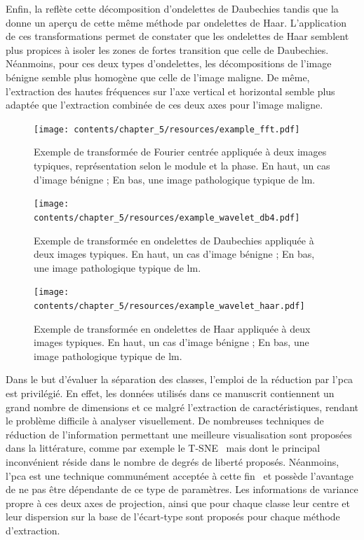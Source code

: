 Enfin, la  reflète cette décomposition d'ondelettes de Daubechies tandis que la  donne un aperçu de cette même méthode par ondelettes de Haar. L'application de ces transformations permet de constater que les ondelettes de Haar semblent plus propices à isoler les zones de fortes transition que celle de Daubechies. Néanmoins, pour ces deux types d'ondelettes, les décompositions de l'image bénigne semble plus homogène que celle de l'image maligne. De même, l'extraction des hautes fréquences sur l'axe vertical et horizontal semble plus adaptée que l'extraction combinée de ces deux axes pour l'image maligne.\par

\begin{figure}[H]
    \centering
    \texttt{[image: contents/chapter\_5/resources/example\_fft.pdf]}
    \caption{Exemple de transformée de Fourier centrée appliquée à deux images typiques, représentation selon le module et la phase. En haut, un cas d'image bénigne ; En bas, une image pathologique typique de \gls{lm}.}
    \label{fig:example_fft}
\end{figure}\par

\begin{figure}[H]
    \centering
    \texttt{[image: contents/chapter\_5/resources/example\_wavelet\_db4.pdf]}
    \caption{Exemple de transformée en ondelettes de Daubechies appliquée à deux images typiques. En haut, un cas d'image bénigne ; En bas, une image pathologique typique de \gls{lm}.}
    \label{fig:example_wavelet_db4}
\end{figure}\par

\begin{figure}[H]
    \centering
    \texttt{[image: contents/chapter\_5/resources/example\_wavelet\_haar.pdf]}
    \caption{Exemple de transformée en ondelettes de Haar appliquée à deux images typiques. En haut, un cas d'image bénigne ; En bas, une image pathologique typique de \gls{lm}.}
    \label{fig:example_wavelet_haar}
\end{figure}\par

Dans le but d'évaluer la séparation des classes, l'emploi de la réduction par l'\gls{pca} est privilégié. En effet, les données utilisés dans ce manuscrit contiennent un grand nombre de dimensions et ce malgré l'extraction de caractéristiques, rendant le problème difficile à analyser visuellement. De nombreuses techniques de réduction de l'information permettant une meilleure visualisation sont proposées dans la littérature, comme par exemple le T-SNE~\cite{Maaten2008} mais dont le principal inconvénient réside dans le nombre de degrés de liberté proposés. Néanmoins, l'\gls{pca} est une technique communément acceptée à cette fin~\cite{Himberg2001} et possède l'avantage de ne pas être dépendante de ce type de paramètres. Les informations de variance propre à ces deux axes de projection, ainsi que pour chaque classe leur centre et leur dispersion sur la base de l'écart-type sont proposés pour chaque méthode d'extraction.\par

